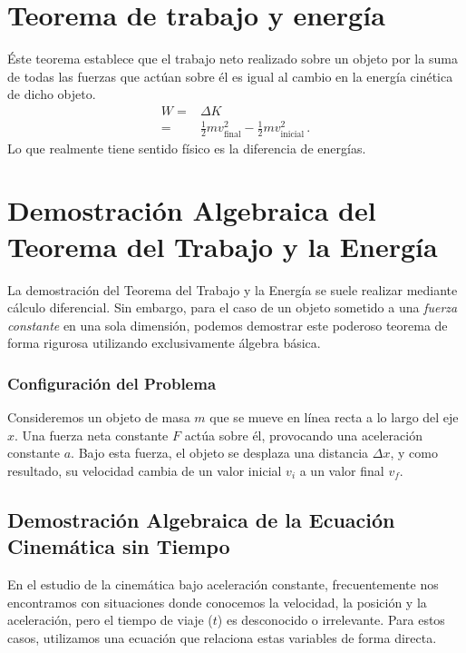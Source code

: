 \documentclass[11pt,a4paper]{book}
\begin{document}
\section{Teorema de trabajo y energía} 
Éste teorema establece que el trabajo neto realizado sobre un objeto por la suma de todas las fuerzas que actúan sobre él es igual al cambio en la energía cinética de dicho objeto. 
\begin{align}
\label{eq:TrabajoEnergía}
    W =& \Delta K\nonumber\\
    =& \frac{1}{2}mv^2_{\text{final}} - \frac{1}{2}mv^2_{\text{inicial}}\,.
\end{align}
Lo que realmente tiene sentido físico es la diferencia de energías.



\section{Demostración Algebraica del Teorema del Trabajo y la Energía}

La demostración del Teorema del Trabajo y la Energía se suele realizar mediante cálculo diferencial. Sin embargo, para el caso de un objeto sometido a una \emph{fuerza constante} en una sola dimensión, podemos demostrar este poderoso teorema de forma rigurosa utilizando exclusivamente álgebra básica.

\subsubsection{Configuración del Problema}

Consideremos un objeto de masa $m$ que se mueve en línea recta a lo largo del eje $x$. Una fuerza neta constante $F$ actúa sobre él, provocando una aceleración constante $a$. Bajo esta fuerza, el objeto se desplaza una distancia $\Delta x$, y como resultado, su velocidad cambia de un valor inicial $v_i$ a un valor final $v_f$.

\subsection{Demostración Algebraica de la Ecuación Cinemática sin Tiempo}

En el estudio de la cinemática bajo aceleración constante, frecuentemente nos encontramos con situaciones donde conocemos la velocidad, la posición y la aceleración, pero el tiempo de viaje ($t$) es desconocido o irrelevante. Para estos casos, utilizamos una ecuación que relaciona estas variables de forma directa. 
\end{document}
